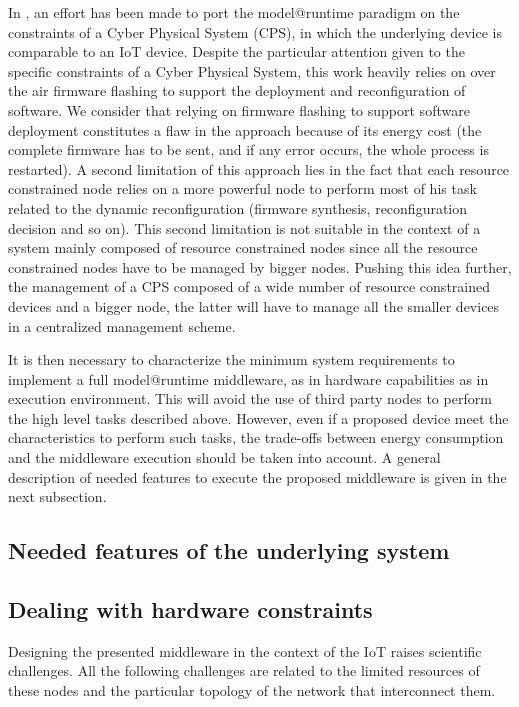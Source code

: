 In \cite{fouquet2012dynamic}, an effort has been made to port the model@runtime paradigm on the constraints of a Cyber Physical System (CPS), in which the underlying device is comparable to an IoT device.
Despite the particular attention given to the specific constraints of a Cyber Physical System, this work heavily relies on over the air firmware flashing to support the deployment and reconfiguration of software. 
We consider that relying on firmware flashing to support software deployment constitutes a flaw in the approach because of its energy cost (the complete firmware has to be sent, and if any error occurs, the whole process is restarted).
A second limitation of this approach lies in the fact that each resource constrained node relies on a more powerful node to perform most of his task related to the dynamic reconfiguration (firmware synthesis, reconfiguration decision and so on).
This second limitation is not suitable in the context of a system mainly composed of resource constrained nodes since all the resource constrained nodes have to be managed by bigger nodes.
Pushing this idea further, the management of a CPS composed of a wide number of resource constrained devices and a bigger node, the latter will have to manage all the smaller devices in a centralized management scheme.

It is then necessary to characterize the minimum system requirements to implement a full model@runtime middleware, as in hardware capabilities as in execution environment.
This will avoid the use of third party nodes to perform the high level tasks described above.
However, even if a proposed device meet the characteristics to perform such tasks, the trade-offs between energy consumption and the middleware execution should be taken into account.
A general description of needed features to execute the proposed middleware is given in the next subsection.

\subsection{Needed features of the underlying system}


\subsection{Dealing with hardware constraints}
Designing the presented middleware in the context of the IoT raises scientific challenges.
All the following challenges are related to the limited resources of these nodes and the particular topology of the network that interconnect them.

